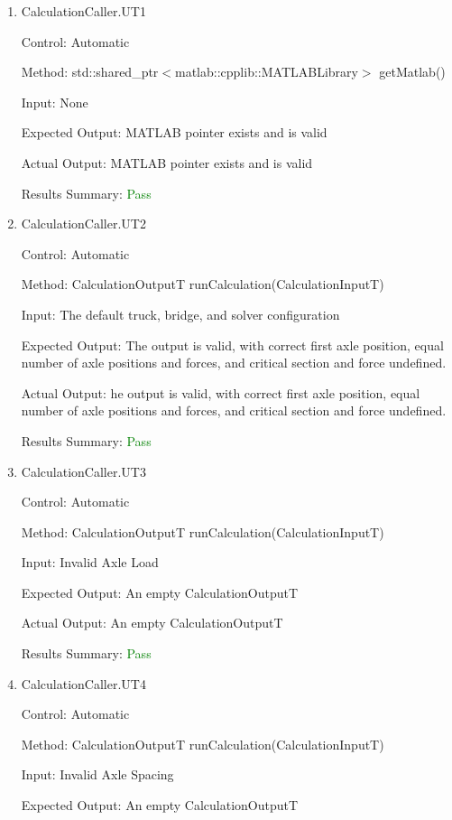 \documentclass[12pt, titlepage]{article}
\begin{document}
\begin{enumerate}
  
  \item {CalculationCaller.UT1}

  Control: Automatic

  Method: std::shared\_ptr$<$matlab::cpplib::MATLABLibrary$>$ getMatlab()

  Input: None

  Expected Output: MATLAB pointer exists and is valid

  Actual Output: MATLAB pointer exists and is valid

  Results Summary: \textcolor{green} {Pass}

  \item {CalculationCaller.UT2}

  Control: Automatic

  Method: CalculationOutputT runCalculation(CalculationInputT)

  Input: The default truck, bridge, and solver configuration

  Expected Output: The output is valid, with correct first axle position,
  equal number of axle positions and forces, and critical section and force undefined.

  Actual Output: he output is valid, with correct first axle position,
  equal number of axle positions and forces, and critical section and force undefined.

  Results Summary: \textcolor{green} {Pass}

  \item {CalculationCaller.UT3}

  Control: Automatic

  Method: CalculationOutputT runCalculation(CalculationInputT)

  Input: Invalid Axle Load

  Expected Output: An empty CalculationOutputT

  Actual Output: An empty CalculationOutputT

  Results Summary: \textcolor{green} {Pass}

  \item {CalculationCaller.UT4}

  Control: Automatic

  Method: CalculationOutputT runCalculation(CalculationInputT)

  Input: Invalid Axle Spacing

  Expected Output: An empty CalculationOutputT


\end{enumerate}
\end{document}
